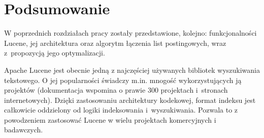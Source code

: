 \chapter{Podsumowanie}

W poprzednich rozdziałach pracy zostały przedstawione, kolejno: funkcjonalności Lucene, jej architektura oraz algorytm łączenia list postingowych, wraz z~propozycją jego optymalizacji.

Apache Lucene jest obecnie jedną z najczęściej używanych bibliotek wyszukiwania tekstowego. O jej popularności świadczy m.in. mnogość wykorzystujących ją projektów (dokumentacja \cite{poweredBy} wspomina o prawie 300 projektach i~stronach internetowych). Dzięki zastosowaniu architektury kodekowej, format indeksu jest całkowicie oddzielony od logiki indeksowania i~wyszukiwania. Pozwala to z powodzeniem zastosować Lucene w wielu projektach komercyjnych i~ badawczych.